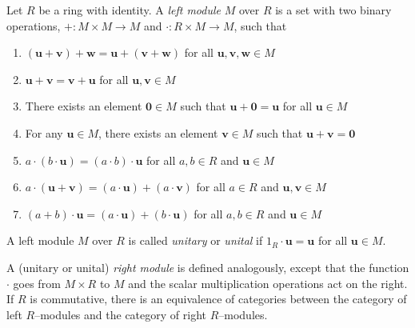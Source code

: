 \documentclass[12pt]{article}
\renewcommand{\u}{\mathbf{u}}
\renewcommand{\v}{\mathbf{v}}
\newcommand{\w}{\mathbf{w}}
\newcommand{\0}{\mathbf{0}}
\begin{document}
Let $R$ be a ring with identity. A {\em left module} $M$ over $R$ is a set with two binary operations, $+: M\times M \longrightarrow M$ and $\cdot: R \times M \longrightarrow M$, such that
\begin{enumerate}
\item $(\u+\v)+\w = \u+(\v+\w)$ for all $\u,\v,\w \in M$
\item $\u+\v=\v+\u$ for all $\u,\v\in M$
\item There exists an element $\0 \in M$ such that $\u+\0=\u$ for all $\u \in M$
\item For any $\u \in M$, there exists an element $\v \in M$ such that $\u+\v=\0$
\item $a \cdot (b \cdot \u) = (a \cdot b) \cdot \u$ for all $a,b \in R$ and $\u \in M$
\item $a \cdot (\u+\v) = (a \cdot \u) + (a \cdot \v)$ for all $a \in R$ and $\u,\v \in M$
\item $(a + b) \cdot \u = (a \cdot \u) + (b \cdot \u)$ for all $a,b \in R$ and $\u \in M$
\end{enumerate}

A left module $M$ over $R$ is called \emph{unitary} or \emph{unital} if $1_R \cdot \u = \u$ for all $\u \in M$.

A (unitary or unital) \emph{right module} is defined analogously, except that the function $\cdot$ goes from $M \times R$ to $M$ and the scalar multiplication operations act on the right. If $R$ is commutative, there is an equivalence of categories between the category of left $R$--modules and the category of right $R$--modules.
\end{document}
